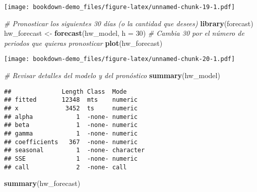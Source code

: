 \documentclass[
]{book}
\newenvironment{Shaded}{\begin{snugshade}}{\end{snugshade}}
\newcommand{\AttributeTok}[1]{\textcolor[rgb]{0.13,0.29,0.53}{#1}}
\newcommand{\CommentTok}[1]{\textcolor[rgb]{0.56,0.35,0.01}{\textit{#1}}}
\newcommand{\DecValTok}[1]{\textcolor[rgb]{0.00,0.00,0.81}{#1}}
\newcommand{\FunctionTok}[1]{\textcolor[rgb]{0.13,0.29,0.53}{\textbf{#1}}}
\newcommand{\NormalTok}[1]{#1}
\newcommand{\OtherTok}[1]{\textcolor[rgb]{0.56,0.35,0.01}{#1}}
\begin{document}
\texttt{[image: bookdown-demo\_files/figure-latex/unnamed-chunk-19-1.pdf]}

\begin{Shaded}
\begin{Highlighting}[]
\CommentTok{\# Pronosticar los siguientes 30 días (o la cantidad que desees)}
\FunctionTok{library}\NormalTok{(forecast)}
\NormalTok{hw\_forecast }\OtherTok{\textless{}{-}} \FunctionTok{forecast}\NormalTok{(hw\_model, }\AttributeTok{h =} \DecValTok{30}\NormalTok{)  }\CommentTok{\# Cambia 30 por el número de periodos que quieras pronosticar}
\FunctionTok{plot}\NormalTok{(hw\_forecast)}
\end{Highlighting}
\end{Shaded}

\texttt{[image: bookdown-demo\_files/figure-latex/unnamed-chunk-20-1.pdf]}

\begin{Shaded}
\begin{Highlighting}[]
\CommentTok{\# Revisar detalles del modelo y del pronóstico}
\FunctionTok{summary}\NormalTok{(hw\_model)}
\end{Highlighting}
\end{Shaded}

\begin{verbatim}
##              Length Class  Mode     
## fitted       12348  mts    numeric  
## x             3452  ts     numeric  
## alpha            1  -none- numeric  
## beta             1  -none- numeric  
## gamma            1  -none- numeric  
## coefficients   367  -none- numeric  
## seasonal         1  -none- character
## SSE              1  -none- numeric  
## call             2  -none- call
\end{verbatim}

\begin{Shaded}
\begin{Highlighting}[]
\FunctionTok{summary}\NormalTok{(hw\_forecast)}
\end{Highlighting}
\end{Shaded}
\end{document}

